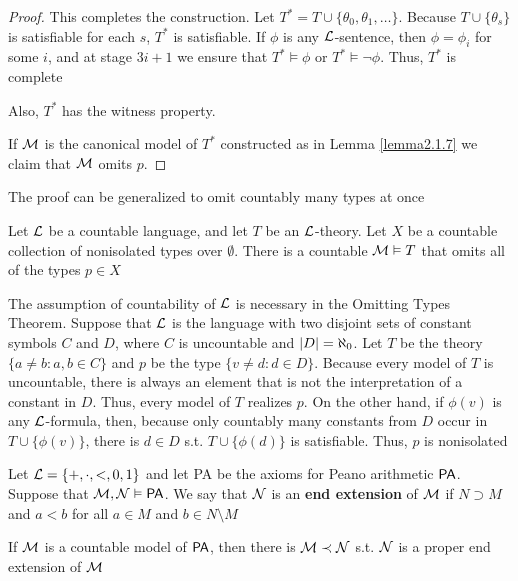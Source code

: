 \documentclass[11pt]{article}
\begin{document}
\begin{proof}
This completes the construction. Let \(T^*=T\cup\{\theta_0,\theta_1,\dots\}\). Because \(T\cup\{\theta_s\}\) is satisfiable
for each \(s\), \(T^*\) is satisfiable. If \(\phi\) is any \(\mathcal{L}\)-sentence, then \(\phi=\phi_i\) for
some \(i\), and at stage \(3i+1\) we ensure that \(T^*\vDash\phi\) or \(T^*\vDash\neg\phi\). Thus, \(T^*\) is
complete

Also, \(T^*\) has the witness property.

If \(\mathcal{M}\) is the canonical model of \(T^*\) constructed as in Lemma \ref{lemma2.1.7} we claim
that \(\mathcal{M}\) omits \(p\).
\end{proof}

The proof can be generalized to omit countably many types at once

\begin{theorem}[]
\label{thm4.2.4}
Let \(\mathcal{L}\) be a countable language, and let \(T\) be an \(\mathcal{L}\)-theory. Let \(X\) be a countable
collection of nonisolated types over \(\emptyset\). There is a countable \(\mathcal{M}\vDash T\) that omits all of the
types \(p\in X\)
\end{theorem}

The assumption of countability of \(\mathcal{L}\) is necessary in the Omitting Types Theorem. Suppose
that \(\mathcal{L}\) is the language with two disjoint sets of constant symbols \(C\) and \(D\),
where \(C\) is uncountable and \(\abs{D}=\aleph_0\). Let \(T\) be the theory \(\{a\neq b:a,b\in C\}\)
and \(p\) be the type \(\{v\neq d:d\in D\}\). Because every model of \(T\) is uncountable, there is
always an element that is not the interpretation of a constant in \(D\). Thus, every model
of \(T\) realizes \(p\).
On the other hand, if \(\phi(v)\) is any \(\mathcal{L}\)-formula, then, because only
countably many constants from \(D\) occur in \(T\cup\{\phi(v)\}\), there is \(d\in D\) s.t. \(T\cup\{\phi(d)\}\)
is satisfiable. Thus, \(p\) is nonisolated \label{Problem5}

Let \(\mathcal{L}=\{+,\cdot,<,0,1\}\) and let PA be the axioms for Peano arithmetic \(\operatorname{\textsf{PA}}\). Suppose
that \(\mathcal{M},\mathcal{N}\vDash\operatorname{\textsf{PA}}\). We say that \(\mathcal{N}\) is an \textbf{end extension} of \(\mathcal{M}\) if \(N\supset M\) and \(a<b\) for
all \(a\in M\) and \(b\in N\setminus M\)

\begin{theorem}[]
If \(\mathcal{M}\) is a countable model of \(\operatorname{\textsf{PA}}\), then there is \(\mathcal{M}\prec\mathcal{N}\) s.t. \(\mathcal{N}\) is a proper end
extension of \(\mathcal{M}\)
\end{theorem}
\end{document}
